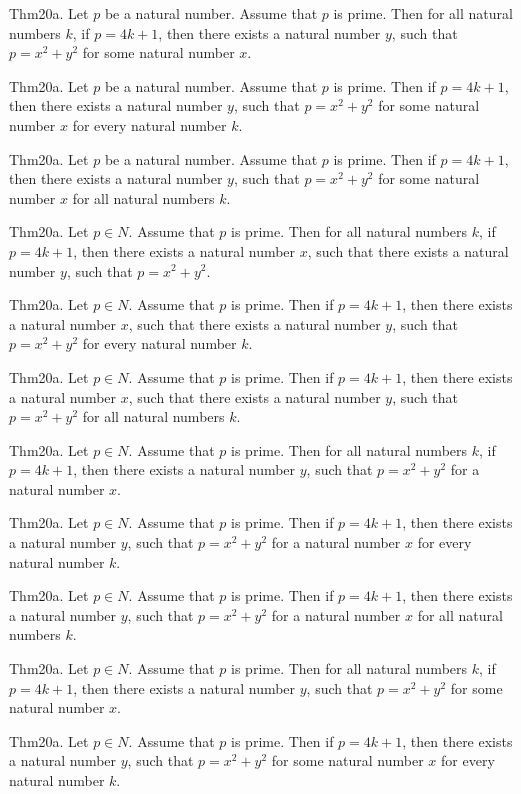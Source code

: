 \documentclass{article}
\begin{document}
Thm20a. Let $p$ be a natural number. Assume that $p$ is prime. Then for all natural numbers $k$, if $p = 4 k + 1$, then there exists a natural number $y$, such that $p = x ^{ 2}+ y ^{ 2}$ for some natural number $x$.

Thm20a. Let $p$ be a natural number. Assume that $p$ is prime. Then if $p = 4 k + 1$, then there exists a natural number $y$, such that $p = x ^{ 2}+ y ^{ 2}$ for some natural number $x$ for every natural number $k$.

Thm20a. Let $p$ be a natural number. Assume that $p$ is prime. Then if $p = 4 k + 1$, then there exists a natural number $y$, such that $p = x ^{ 2}+ y ^{ 2}$ for some natural number $x$ for all natural numbers $k$.

Thm20a. Let $p \in N$. Assume that $p$ is prime. Then for all natural numbers $k$, if $p = 4 k + 1$, then there exists a natural number $x$, such that there exists a natural number $y$, such that $p = x ^{ 2}+ y ^{ 2}$.

Thm20a. Let $p \in N$. Assume that $p$ is prime. Then if $p = 4 k + 1$, then there exists a natural number $x$, such that there exists a natural number $y$, such that $p = x ^{ 2}+ y ^{ 2}$ for every natural number $k$.

Thm20a. Let $p \in N$. Assume that $p$ is prime. Then if $p = 4 k + 1$, then there exists a natural number $x$, such that there exists a natural number $y$, such that $p = x ^{ 2}+ y ^{ 2}$ for all natural numbers $k$.

Thm20a. Let $p \in N$. Assume that $p$ is prime. Then for all natural numbers $k$, if $p = 4 k + 1$, then there exists a natural number $y$, such that $p = x ^{ 2}+ y ^{ 2}$ for a natural number $x$.

Thm20a. Let $p \in N$. Assume that $p$ is prime. Then if $p = 4 k + 1$, then there exists a natural number $y$, such that $p = x ^{ 2}+ y ^{ 2}$ for a natural number $x$ for every natural number $k$.

Thm20a. Let $p \in N$. Assume that $p$ is prime. Then if $p = 4 k + 1$, then there exists a natural number $y$, such that $p = x ^{ 2}+ y ^{ 2}$ for a natural number $x$ for all natural numbers $k$.

Thm20a. Let $p \in N$. Assume that $p$ is prime. Then for all natural numbers $k$, if $p = 4 k + 1$, then there exists a natural number $y$, such that $p = x ^{ 2}+ y ^{ 2}$ for some natural number $x$.

Thm20a. Let $p \in N$. Assume that $p$ is prime. Then if $p = 4 k + 1$, then there exists a natural number $y$, such that $p = x ^{ 2}+ y ^{ 2}$ for some natural number $x$ for every natural number $k$.
\end{document}
